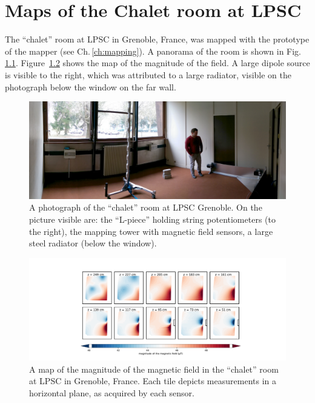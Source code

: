 \chapter{Maps of the Chalet room at LPSC}
\label{ch:chalet_appendix}
The ``chalet'' room at LPSC in Grenoble, France, was mapped with the prototype of the mapper (see Ch.\,\ref{ch:mapping}). A panorama of the room is shown in Fig.\,\ref{fig:mapping_lpsc_chalet}. Figure~\ref{fig:mapping_lpsc_chalet_magnitude_map} shows the map of the magnitude of the field. A large dipole source is visible to the right, which was attributed to a large radiator, visible on the photograph below the window on the far wall.

\begin{figure}
  \centering
  \includegraphics[width=\linewidth]{gfx/mapping/lpsc/chalet_panorama.jpg}
  \caption{A photograph of the ``chalet'' room at LPSC Grenoble. On the picture visible are: the ``L-piece'' holding string potentiometers (to the right), the mapping tower with magnetic field sensors, a large steel radiator (below the window).}\label{fig:mapping_lpsc_chalet}
\end{figure}

\begin{figure}
  \centering
  \includegraphics[width=\linewidth]{gfx/mapping/lpsc/chalet.pdf}
  \caption{A map of the magnitude of the magnetic field in the ``chalet'' room at LPSC in Grenoble, France. Each tile depicts measurements in a horizontal plane, as acquired by each sensor.}\label{fig:mapping_lpsc_chalet_magnitude_map}
\end{figure}
